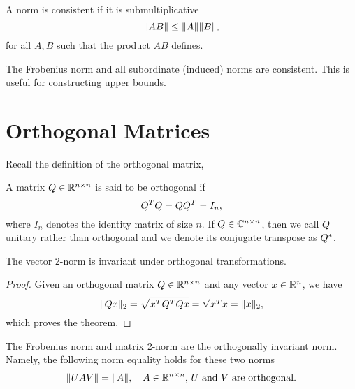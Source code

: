\begin{definition}
  A norm is consistent if it is submultiplicative
  \begin{equation}
    \|{AB}\| \leq \|{A}\| \|{B}\|,
  \end{equation}
  for all $A,B$ such that the product $AB$ defines.
\end{definition}

\begin{example}
  The Frobenius norm and all subordinate (induced) norms are consistent. This is useful for constructing upper bounds.
\end{example}

\section{Orthogonal Matrices}

Recall the definition of the orthogonal matrix,
\begin{definition}
  A matrix $Q\in\mathbb{R}^{n\times n}$ is said to be orthogonal if
  \begin{equation}\notag
    Q^T Q = QQ^T = I_n,
  \end{equation}
  where $I_n$ denotes the identity matrix of size $n$. If $Q\in\mathbb{C}^{n\times n}$, then we call $Q$ unitary rather than orthogonal and we denote its conjugate transpose as $Q^*$.
\end{definition}

\begin{theorem}
  The vector 2-norm is invariant under orthogonal transformations.
\end{theorem}

\begin{proof}
  Given an orthogonal matrix $Q\in\mathbb{R}^{n\times n}$ and any vector $x\in\mathbb{R}^n$, we have 
  \begin{equation}\notag
    \|{Qx}\|_2 = \sqrt{x^T Q^T Q x} = \sqrt{x^T x} = \|{x}\|_2,
  \end{equation}
  which proves the theorem.
\end{proof}

\begin{theorem} 
  \label{thm:matrix-invariant-norm}
  The Frobenius norm and matrix 2-norm are the orthogonally invariant norm. Namely, the following norm equality holds for these two norms
  \begin{equation}\notag
    \|{UAV}\| = \|{A}\|,\quad \text{$A\in\mathbb{R}^{n\times n}$, $U$ and $V$ are orthogonal.}
  \end{equation}
\end{theorem}

